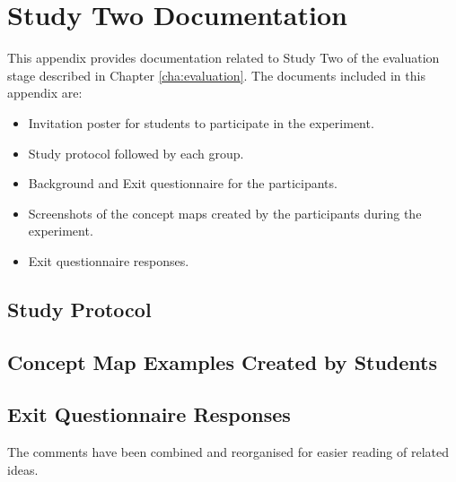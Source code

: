 \chapter{Study Two Documentation \label{cha:app6}}

This appendix provides documentation related to Study Two of the evaluation
stage described in Chapter \ref{cha:evaluation}. The documents included in this
appendix are:

\begin{itemize}
  \item Invitation poster for students to participate in the experiment.
  \item Study protocol followed by each group.
  \item Background and Exit questionnaire for the participants.
  \item Screenshots of the concept maps created by the participants during the
  experiment.
  \item Exit questionnaire responses.
\end{itemize}



\section{Study Protocol}




\section{Concept Map Examples Created by Students}

\section{Exit Questionnaire Responses}
\label{sec:responses}
The comments have been combined and reorganised for easier reading of related
ideas.

